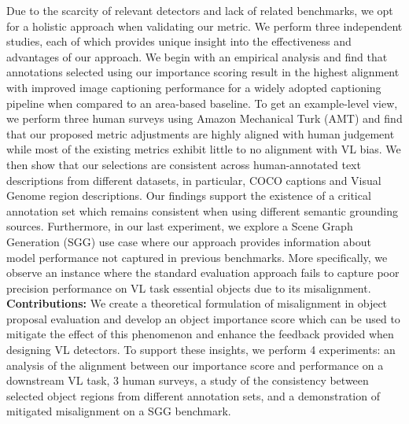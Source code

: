 \documentclass[10pt,twocolumn,letterpaper]{article}
\begin{document}
Due to the scarcity of relevant detectors and lack of related benchmarks, we opt for a holistic approach when validating our metric. We perform three independent studies, each of which provides unique insight into the effectiveness and advantages of our approach. We begin with an empirical analysis and find that annotations selected using our importance scoring result in the highest alignment with improved image captioning performance for a widely adopted captioning pipeline when compared to an area-based baseline. To get an example-level view, we perform three human surveys using Amazon Mechanical Turk (AMT) and find that our proposed metric adjustments are highly aligned with human judgement while most of the existing metrics exhibit little to no alignment with VL bias. We then show that our selections are consistent across human-annotated text descriptions from different datasets, in particular, COCO captions and Visual Genome region descriptions. Our findings support the existence of a critical annotation set which remains consistent when using different semantic grounding sources. Furthermore, in our last experiment, we explore a Scene Graph Generation (SGG) use case where our approach provides information about model performance not captured in previous benchmarks. More specifically, we observe an instance where the standard evaluation approach fails to capture poor precision performance on VL task essential objects due to its misalignment. \vspace{1mm}
\\
\textbf{Contributions:} We create a theoretical formulation of misalignment in object proposal evaluation and develop an object importance score which can be used to mitigate the effect of this phenomenon and enhance the feedback provided when designing VL detectors. To support these insights, we perform 4 experiments: an analysis of the alignment between our importance score and performance on a downstream VL task, 3 human surveys, a study of the consistency between selected object regions from different annotation sets, and a demonstration of mitigated misalignment on a SGG benchmark.
\end{document}

